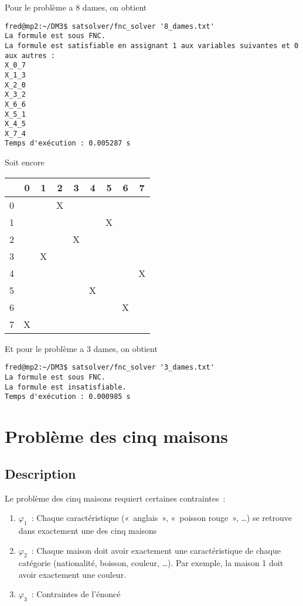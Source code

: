     Pour le problème a 8 dames, on obtient
    \begin{lstlisting}
fred@mp2:~/DM3$ satsolver/fnc_solver '8_dames.txt'
La formule est sous FNC.
La formule est satisfiable en assignant 1 aux variables suivantes et 0 aux autres :
X_0_7
X_1_3
X_2_0
X_3_2
X_6_6
X_5_1
X_4_5
X_7_4
Temps d'exécution : 0.005287 s
    \end{lstlisting}
    Soit encore
    \begin{center}
        \begin{tabular}{| c || *{8}{c |}}
        \hline
          & 0 & 1 & 2 & 3 & 4 & 5 & 6 & 7 \\
        \hline
        \hline
        0 &   &   & X &   &   &   &   &   \\
        \hline
        1 &   &   &   &   &   & X &   &   \\
        \hline
        2 &   &   &   & X &   &   &   &   \\
        \hline
        3 &   & X &   &   &   &   &   &   \\
        \hline
        4 &   &   &   &   &   &   &   & X \\
        \hline
        5 &   &   &   &   & X &   &   &   \\
        \hline
        6 &   &   &   &   &   &   & X &   \\
        \hline
        7 & X &   &   &   &   &   &   &   \\
        \hline
        \end{tabular}
    \end{center}
    
    Et pour le problème a 3 dames, on obtient
    \begin{lstlisting}
fred@mp2:~/DM3$ satsolver/fnc_solver '3_dames.txt'
La formule est sous FNC.
La formule est insatisfiable.
Temps d'exécution : 0.000985 s
    \end{lstlisting}


    \section{Problème des cinq maisons}
    \subsection{Description}
    Le problème des cinq maisons requiert certaines contraintes~:
    \begin{enumerate}
        \item $\varphi_1$~: Chaque caractéristique («~anglais~», «~poisson
            rouge~», …) se retrouve dans exactement une des cinq maisons
        \item $\varphi_2$~: Chaque maison doit avoir exactement une caractéristique de chaque
            catégorie (nationalité, boisson, couleur, …). Par exemple, la maison
            1 doit avoir exactement une couleur.
        \item $\varphi_3$~: Contraintes de l’énoncé
    \end{enumerate}

